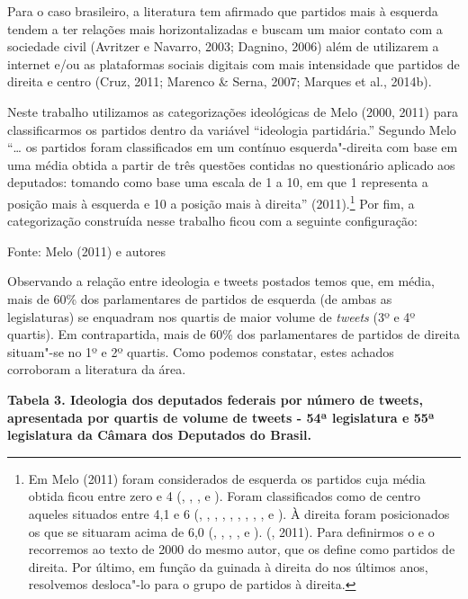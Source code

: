 Para o caso brasileiro, a literatura tem afirmado que partidos mais à
esquerda tendem a ter relações mais horizontalizadas e buscam um maior
contato com a sociedade civil (Avritzer e Navarro, 2003; Dagnino, 2006)
além de utilizarem a internet e/ou as plataformas sociais digitais com
mais intensidade que partidos de direita e centro (Cruz, 2011; Marenco
\& Serna, 2007; Marques et al., 2014b).

Neste trabalho utilizamos as categorizações ideológicas de Melo (2000,
2011) para classificarmos os partidos dentro da variável ``ideologia
partidária.'' Segundo Melo ``\ldots{} os partidos foram classificados em um
contínuo esquerda"-direita com base em uma média obtida a partir de três
questões contidas no questionário aplicado aos deputados: tomando como
base uma escala de 1 a 10, em que 1 representa a posição mais à esquerda
e 10 a posição mais à direita'' (2011).\footnote{Em Melo (2011) foram
  considerados de esquerda os partidos cuja média obtida ficou entre
  zero e 4 (, , ,  e ). Foram classificados como de
  centro aqueles situados entre 4,1 e 6 (, , , , ,
  , , , ,  e ). À direita foram posicionados os que
  se situaram acima de 6,0 (, , , ,  e ). (, 2011).
  Para definirmos o  e o  recorremos ao texto de 2000 do mesmo
  autor, que os define como partidos de direita. Por último, em função
  da guinada à direita do  nos últimos anos, resolvemos desloca"-lo
  para o grupo de partidos à direita.} Por fim, a categorização
construída nesse trabalho ficou com a seguinte configuração:

Fonte: Melo (2011) e autores

Observando a relação entre ideologia e tweets postados temos que, em
média, mais de 60\% dos parlamentares de partidos de esquerda (de ambas
as legislaturas) se enquadram nos quartis de maior volume de
\emph{tweets} (3º e 4º quartis). Em contrapartida, mais de 60\% dos
parlamentares de partidos de direita situam"-se no 1º e 2º quartis. Como
podemos constatar, estes achados corroboram a literatura da área.

\textbf{Tabela 3. Ideologia dos deputados federais por número de tweets,
apresentada por quartis de volume de tweets - 54ª legislatura e 55ª
legislatura da Câmara dos Deputados do Brasil.}


